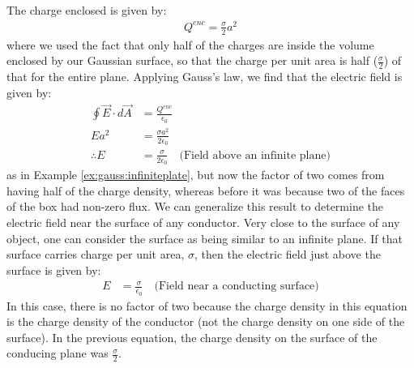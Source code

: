 The charge enclosed is given by:
\begin{align*}
Q^{enc}=\frac{\sigma}{2}a^2
\end{align*}
where we used the fact that only half of the charges are inside the volume enclosed by our Gaussian surface, so that the charge per unit area is half ($\frac{\sigma}{2}$) of that for the entire plane. Applying Gauss's law, we find that the electric field is given by:
\begin{align*}
\oint \vec E\cdot d\vec A&=\frac{Q^{enc}}{\epsilon_0} \\
Ea^2&= \frac{\sigma a^2}{2\epsilon_0}\\
\therefore E&= \frac{\sigma}{2\epsilon_0}\quad \text{(Field above an infinite plane)}
\end{align*}
as in Example \ref{ex:gauss:infiniteplate}, but now the factor of two comes from having half of the charge density, whereas before it was because two of the faces of the box had non-zero flux. We can generalize this result to determine the electric field near the surface of any conductor. Very close to the surface of any object, one can consider the surface as being similar to an infinite plane. If that surface carries charge per unit area, $\sigma$, then the electric field just above the surface is given by:
\begin{align*}
 E&= \frac{\sigma}{\epsilon_0} \quad \text{(Field near a conducting surface)}
\end{align*}
In this case, there is no factor of two because the charge density in this equation is the charge density of the conductor (not the charge density on one side of the surface). In the previous equation, the charge density on the surface of the conducing plane was $\frac{\sigma}{2}$.


